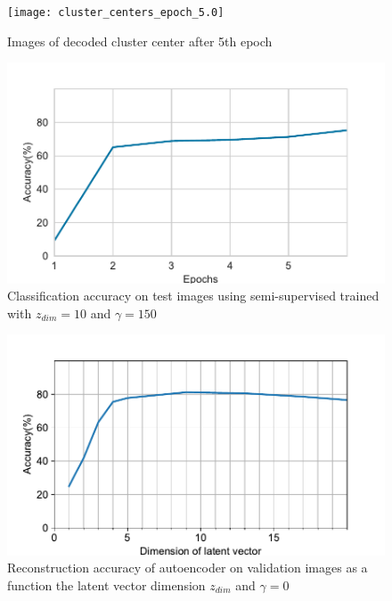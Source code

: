 \documentclass{uai2021} %
\begin{document}
\begin{figure}[]
\centering
\texttt{[image: cluster\_centers\_epoch\_5.0]}
\caption{Images of decoded cluster center after 5th epoch}
\label{cluster_center_6}
\end{figure}

\begin{figure}[]
\centering
\includegraphics[width=\linewidth]{classification_accuracy}
\caption{Classification accuracy on test images using semi-supervised trained with $z_{dim}=10$ and $\gamma = 150$}
\label{classification_accuracy}
\end{figure}

\begin{figure}[]
\centering
\includegraphics[width=\linewidth]{reconstruction_accuracy}
\caption{Reconstruction accuracy of autoencoder on validation images as a function the latent vector dimension  $z_{dim}$ and $\gamma = 0$}
\label{reconstruction_accuracy}
\end{figure}
\end{document}

